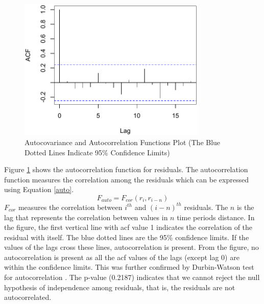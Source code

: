 \documentclass[preprint,review,12pt]{elsarticle}
\begin{document}
\begin{figure}[!ht]
\centering
    \includegraphics[width=90mm, keepaspectratio]{autocorrelation.pdf}
    \vspace{-0.2cm}
    \caption{Autocovariance and Autocorrelation Functions Plot (The Blue Dotted Lines Indicate 95\% Confidence Limits)}
    \label{afp}
\end{figure}
Figure \ref{afp} shows the autocorrelation function for residuals. The autocorrelation function measures the correlation among the residuals which can be expressed using Equation \ref{auto}.
\begin{equation}
F_{auto}=F_{cor}(r_{i},r_{i-n})
\label{auto}
\end{equation}
$F_{cor}$ measures the correlation between $i^{th}$ and $(i-n)^{th}$ residuals. The $n$ is the lag that represents the correlation between values in $n$ time periods distance. In the figure, the first vertical line with acf value 1 indicates the correlation of the residual with itself. The blue dotted lines are the 95\% confidence limits. If the values of the lags cross these lines, autocorrelation is present. From the figure, no autocorrelation is present as all the acf values of the lags (except lag 0) are within the confidence limits. This was further confirmed by Durbin-Watson test for autocorrelation \cite{durbin1951testing}. The p-value (0.2187) indicates that we cannot reject the null hypothesis of independence among residuals, that is, the residuals are not autocorrelated. 
\end{document}
